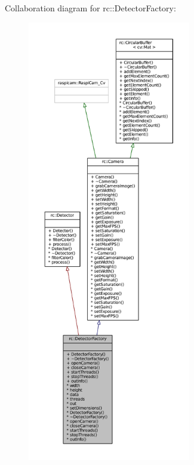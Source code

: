 Collaboration diagram for rc\+:\+:Detector\+Factory\+:\nopagebreak
\begin{figure}[H]
\begin{center}
\leavevmode
\includegraphics[height=550pt]{classrc_1_1DetectorFactory__coll__graph}
\end{center}
\end{figure}
